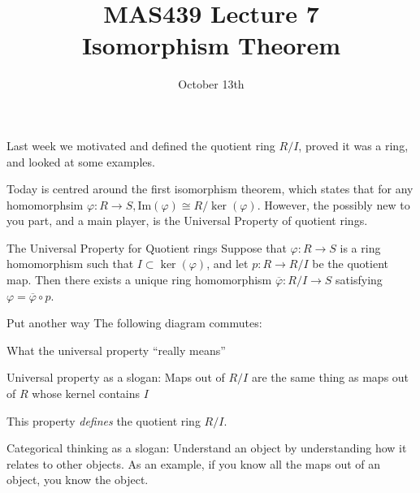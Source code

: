\documentclass{beamer}
\title{MAS439 Lecture 7 \\ Isomorphism Theorem}
\date{October 13th}
\begin{document}
\begin{frame}
\titlepage
\end{frame}


\begin{frame}{}
Last week we motivated and defined the quotient ring $R/I$, proved it was a ring, and looked at some examples.

Today is centred around the first isomorphism theorem, which states that for any homomorphsim $\varphi:R\to S, \textrm{Im}(\varphi)\cong R/\ker(\varphi)$.  However, the possibly new to you part, and a main player, is the Universal Property of quotient rings.

\end{frame}

\begin{frame}[fragile]{The Universal Property for Quotient rings}
Suppose that $\varphi:R \to S$ is a ring homomorphism such that $I\subset \ker(\varphi)$, and let $p:R\to R/I$ be the quotient map.   Then there exists a unique ring homomorphism $\overline{\varphi}:R/I\to S$ satisfying $\varphi=\overline{\varphi}\circ p$.

\begin{block}{Put another way}
The following diagram commutes:
\begin{center}
\end{center}
\end{block}

\end{frame}

\begin{frame}{What the universal property ``really means''}
\begin{block}{Universal property as a slogan:}
Maps out of $R/I$ are the same thing as maps out of $R$ whose kernel contains $I$
\end{block}

This property \emph{defines} the quotient ring $R/I$.

\begin{block}{Categorical thinking as a slogan:}
Understand an object by understanding how it relates to other objects.  As an example, if you know all the maps out of an object, you know the object.
\end{block}
\end{frame}
\end{document}
